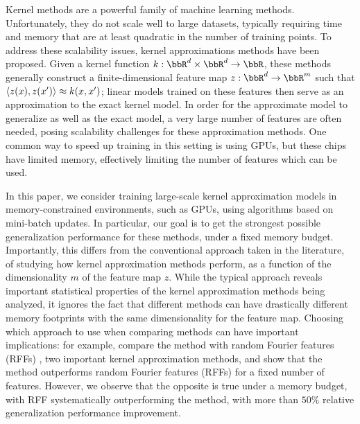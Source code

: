 Kernel methods are a powerful family of machine learning methods.  Unfortunately, they do not scale well to large datasets, typically requiring time and memory that are at least quadratic in the number of training points. To address these scalability issues, kernel approximations methods have been proposed. Given a kernel function $k:\RR^d\times\RR^d\rightarrow \RR$, these methods generally construct a finite-dimensional feature map $z: \RR^d \rightarrow \RR^m$ such that $\langle z(x),z(x') \rangle \approx k(x,x')$; linear models trained on these features then serve as an approximation to the exact kernel model. In order for the approximate model to generalize as well as the exact model, a very large number of features are often needed, posing scalability challenges for these approximation methods.  One common way to speed up training in this setting is using GPUs, but these chips have limited memory, effectively limiting the number of features which can be used. 

In this paper, we consider training large-scale kernel approximation models in memory-constrained environments, such as GPUs, using algorithms based on mini-batch updates. In particular, our goal is to get the strongest possible generalization performance for these methods, under a fixed memory budget.  Importantly, this differs from the conventional approach taken in the literature, of studying how kernel approximation methods perform, as a function of the dimensionality $m$ of the feature map $z$. While the typical approach reveals important statistical properties of the kernel approximation methods being analyzed, it ignores the fact that different methods can have drastically different memory footprints with the same dimensionality for the feature map. Choosing which approach to use when comparing methods can have important implications: for example, \citet{nysvsrff12} compare the \Nystrom method \citep{nystrom} with random Fourier features (RFFs) \citep{rahimi07random}, two important kernel approximation methods, and show that the \Nystrom method \citep{nystrom} outperforms random Fourier features (RFFs) \citep{rahimi07random} for a fixed number of features.  However, we observe that the opposite is true under a memory budget, with RFF systematically outperforming the \Nystrom method, with more than $50\%$ relative generalization performance improvement.



